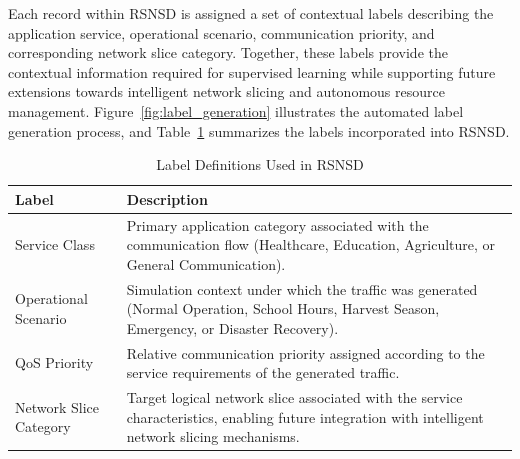 \documentclass[12pt,a4paper]{report}
\begin{document}
	Each record within RSNSD is assigned a set of contextual labels describing the application service, operational scenario, communication priority, and corresponding network slice category. Together, these labels provide the contextual information required for supervised learning while supporting future extensions towards intelligent network slicing and autonomous resource management. Figure~\ref{fig:label_generation} illustrates the automated label generation process, and Table~\ref{tab:labels} summarizes the labels incorporated into RSNSD.
	

	
	\begin{table}[H]
		\centering
		\caption{Label Definitions Used in RSNSD}
		\label{tab:labels}
		
		\begin{tabular}{|p{5cm}|p{9cm}|}
			\hline
			
			\textbf{Label} &
			\textbf{Description}
			\\
			\hline
			
			Service Class &
			Primary application category associated with the communication flow (Healthcare, Education, Agriculture, or General Communication).
			\\
			\hline
			
			Operational Scenario &
			Simulation context under which the traffic was generated (Normal Operation, School Hours, Harvest Season, Emergency, or Disaster Recovery).
			\\
			\hline
			
			QoS Priority &
			Relative communication priority assigned according to the service requirements of the generated traffic.
			\\
			\hline
			
			Network Slice Category &
			Target logical network slice associated with the service characteristics, enabling future integration with intelligent network slicing mechanisms.
			\\
			\hline
			
		\end{tabular}
		
	\end{table}
	
\end{document}
